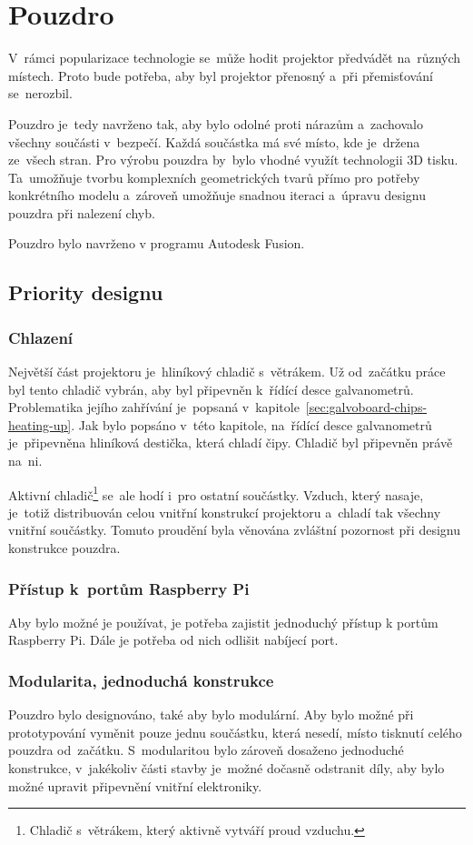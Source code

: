 \section{Pouzdro}

V~rámci popularizace technologie se~může hodit projektor předvádět na~různých místech. Proto bude potřeba, aby byl projektor přenosný a~při přemisťování se~nerozbil.

Pouzdro je~tedy navrženo tak, aby bylo odolné proti nárazům a~zachovalo všechny součásti v~bezpečí. Každá součástka má své místo, kde je~držena ze~všech stran. Pro výrobu pouzdra by~bylo vhodné využít technologii 3D tisku. Ta~umožňuje tvorbu komplexních geometrických tvarů přímo pro potřeby konkrétního modelu a~zároveň umožňuje snadnou iteraci a~úpravu designu pouzdra při nalezení chyb.

Pouzdro bylo navrženo v programu Autodesk Fusion.

\subsection{Priority designu} \label{sec:krabick-design-priorities}
\subsubsection{Chlazení}
Největší část projektoru je~hliníkový chladič s~větrákem. Už od~začátku práce byl tento chladič vybrán, aby byl připevněn k~řídící desce galvanometrů. Problematika jejího zahřívání je~popsaná v~kapitole~\ref{sec:galvoboard-chips-heating-up}.
Jak bylo popsáno v~této kapitole, na~řídící desce galvanometrů je~připevněna hliníková destička, která chladí čipy. Chladič byl připevněn právě na~ni.

Aktivní chladič\footnote{Chladič s~větrákem, který aktivně vytváří proud vzduchu.} se~ale hodí i~pro ostatní součástky. Vzduch, který nasaje, je~totiž distribuován celou vnitřní konstrukcí projektoru a~chladí tak všechny vnitřní součástky. Tomuto proudění byla věnována zvláštní pozornost při designu konstrukce pouzdra.

\subsubsection{Přístup k~portům Raspberry Pi}
Aby bylo možné je používat, je potřeba zajistit jednoduchý přístup k portům Raspberry Pi. Dále je potřeba od nich odlišit nabíjecí port.

\subsubsection{Modularita, jednoduchá konstrukce}
Pouzdro bylo designováno, také aby bylo modulární. Aby bylo možné při prototypování vyměnit pouze jednu součástku, která nesedí, místo tisknutí celého pouzdra od~začátku. S~modularitou bylo zároveň dosaženo jednoduché konstrukce, v~jakékoliv části stavby je~možné dočasně odstranit díly, aby bylo možné upravit připevnění vnitřní elektroniky.

